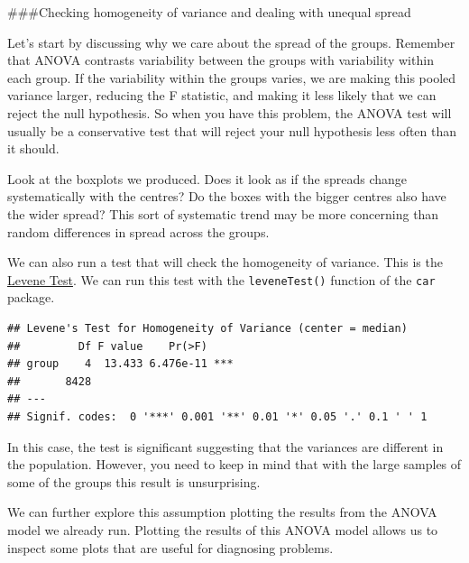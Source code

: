 \documentclass[]{book}
\newenvironment{Shaded}{\begin{snugshade}}{\end{snugshade}}
\newcommand{\DataTypeTok}[1]{\textcolor[rgb]{0.13,0.29,0.53}{#1}}
\newcommand{\KeywordTok}[1]{\textcolor[rgb]{0.13,0.29,0.53}{\textbf{#1}}}
\newcommand{\NormalTok}[1]{#1}
\newcommand{\OperatorTok}[1]{\textcolor[rgb]{0.81,0.36,0.00}{\textbf{#1}}}
\theoremstyle{definition}
\theoremstyle{definition}
\theoremstyle{definition}
\theoremstyle{remark}
\begin{document}
\#\#\#Checking homogeneity of variance and dealing with unequal spread

Let's start by discussing why we care about the spread of the groups.
Remember that ANOVA contrasts variability between the groups with
variability within each group. If the variability within the groups
varies, we are making this pooled variance larger, reducing the F
statistic, and making it less likely that we can reject the null
hypothesis. So when you have this problem, the ANOVA test will usually
be a conservative test that will reject your null hypothesis less often
than it should.

Look at the boxplots we produced. Does it look as if the spreads change
systematically with the centres? Do the boxes with the bigger centres
also have the wider spread? This sort of systematic trend may be more
concerning than random differences in spread across the groups.

We can also run a test that will check the homogeneity of variance. This
is the \href{http://en.wikipedia.org/wiki/Levene's_test}{Levene Test}.
We can run this test with the \texttt{leveneTest()} function of the
\texttt{car} package.

\begin{Shaded}
\end{Shaded}

\begin{verbatim}
## Levene's Test for Homogeneity of Variance (center = median)
##         Df F value    Pr(>F)    
## group    4  13.433 6.476e-11 ***
##       8428                      
## ---
## Signif. codes:  0 '***' 0.001 '**' 0.01 '*' 0.05 '.' 0.1 ' ' 1
\end{verbatim}

In this case, the test is significant suggesting that the variances are
different in the population. However, you need to keep in mind that with
the large samples of some of the groups this result is unsurprising.

We can further explore this assumption plotting the results from the
ANOVA model we already run. Plotting the results of this ANOVA model
allows us to inspect some plots that are useful for diagnosing problems.
\end{document}
